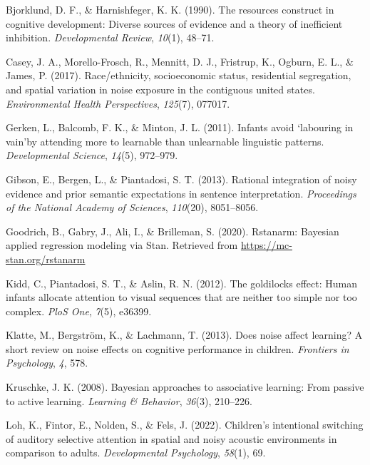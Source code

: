 \documentclass[10pt, letterpaper]{article}
\newenvironment{CSLReferences}%
  {}%
  {\par}
\begin{document}
\hypertarget{refs}{}
\begin{CSLReferences}{1}{0}
\leavevmode{}%
Bjorklund, D. F., \& Harnishfeger, K. K. (1990). The resources construct
in cognitive development: Diverse sources of evidence and a theory of
inefficient inhibition. \emph{Developmental Review}, \emph{10}(1),
48--71.

\leavevmode{}%
Casey, J. A., Morello-Frosch, R., Mennitt, D. J., Fristrup, K., Ogburn,
E. L., \& James, P. (2017). Race/ethnicity, socioeconomic status,
residential segregation, and spatial variation in noise exposure in the
contiguous united states. \emph{Environmental Health Perspectives},
\emph{125}(7), 077017.

\leavevmode{}%
Gerken, L., Balcomb, F. K., \& Minton, J. L. (2011). Infants avoid
`labouring in vain'by attending more to learnable than unlearnable
linguistic patterns. \emph{Developmental Science}, \emph{14}(5),
972--979.

\leavevmode{}%
Gibson, E., Bergen, L., \& Piantadosi, S. T. (2013). Rational
integration of noisy evidence and prior semantic expectations in
sentence interpretation. \emph{Proceedings of the National Academy of
Sciences}, \emph{110}(20), 8051--8056.

\leavevmode{}%
Goodrich, B., Gabry, J., Ali, I., \& Brilleman, S. (2020). Rstanarm:
{Bayesian} applied regression modeling via {Stan}. Retrieved from
\url{https://mc-stan.org/rstanarm}

\leavevmode{}%
Kidd, C., Piantadosi, S. T., \& Aslin, R. N. (2012). The goldilocks
effect: Human infants allocate attention to visual sequences that are
neither too simple nor too complex. \emph{PloS One}, \emph{7}(5),
e36399.

\leavevmode{}%
Klatte, M., Bergström, K., \& Lachmann, T. (2013). Does noise affect
learning? A short review on noise effects on cognitive performance in
children. \emph{Frontiers in Psychology}, \emph{4}, 578.

\leavevmode{}%
Kruschke, J. K. (2008). Bayesian approaches to associative learning:
From passive to active learning. \emph{Learning \& Behavior},
\emph{36}(3), 210--226.

\leavevmode{}%
Loh, K., Fintor, E., Nolden, S., \& Fels, J. (2022). Children's
intentional switching of auditory selective attention in spatial and
noisy acoustic environments in comparison to adults. \emph{Developmental
Psychology}, \emph{58}(1), 69.


\end{CSLReferences}
\end{document}
